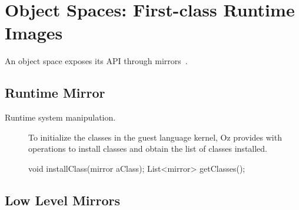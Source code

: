 %
%

\section{Object Spaces: First-class Runtime Images} \label{sec:membrane}

An object space exposes its API through mirrors~\cite{Brac04b}. 


\subsection{Runtime Mirror}

\begin{description}
\item[Runtime system manipulation.] To initialize the classes in the guest language kernel, Oz provides with operations to install classes and obtain the list of classes installed.
\begin{code}
void installClass(mirror aClass);
List<mirror> getClasses();
\end{code}

\end{description}

\subsection{Low Level Mirrors}

